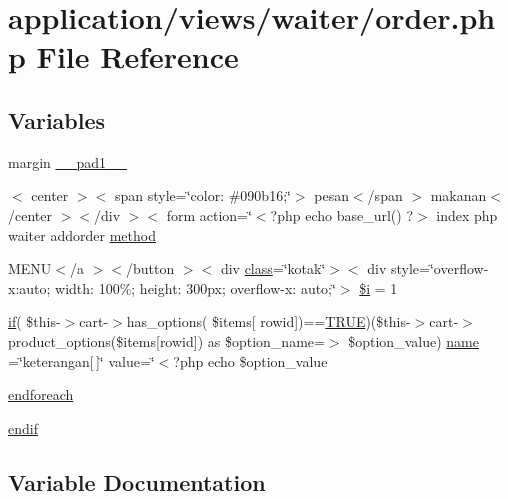 \hypertarget{waiter_2order_8php}{}\section{application/views/waiter/order.php File Reference}
\label{waiter_2order_8php}
\subsection*{Variables}
\begin{DoxyCompactItemize}
\item 
margin \mbox{\hyperlink{waiter_2order_8php_ad8bce65b4dd2f91678e5fe6c17c263b4}{\+\_\+\+\_\+pad1\+\_\+\+\_\+}}
\item 
$<$ center $>$$<$ span style=\char`\"{}color\+: \#090b16;\char`\"{}$>$ pesan$<$/span $>$ makanan$<$/center $>$$<$/div $>$$<$ form action=\char`\"{}$<$?php echo base\+\_\+url() ?$>$ index php waiter addorder \mbox{\hyperlink{waiter_2order_8php_ac0cc2006fd803bf741cbbe406e3f6361}{method}}
\item 
M\+E\+NU$<$/a $>$$<$/button $>$$<$ div \mbox{\hyperlink{waiter_2olaporan_8php_a185c73c6507391d1eb38c776b68ce96d}{class}}=\char`\"{}kotak\char`\"{}$>$$<$ div style=\char`\"{}overflow-\/x\+:auto; width\+: 100\%; height\+: 300px; overflow-\/x\+: auto;\char`\"{}$>$ \mbox{\hyperlink{waiter_2order_8php_a83018d9153d17d91fbcf3bc10158d34f}{\$i}} = 1
\item 
\mbox{\hyperlink{_code_igniter_8php_a68ca62d45495d195f67d234bdafb1d1f}{if}}( \$this-\/$>$cart-\/$>$has\+\_\+options( \$items\mbox{[} \textquotesingle{}rowid\textquotesingle{}\mbox{]})==\mbox{\hyperlink{constants_8php_ae04a3efe6aa42044f803ee90c2277846}{T\+R\+UE}})(\$this-\/$>$cart-\/$>$product\+\_\+options(\$items\mbox{[}\textquotesingle{}rowid\textquotesingle{}\mbox{]}) as \$option\+\_\+name=$>$ \$option\+\_\+value) \mbox{\hyperlink{waiter_2order_8php_afb270cde4944e425a37cf277116a7f43}{name}} =\char`\"{}keterangan\mbox{[}$\,$\mbox{]}\char`\"{} value=\char`\"{}$<$?php echo \$option\+\_\+value
\item 
\mbox{\hyperlink{waiter_2order_8php_a672d9707ef91db026c210f98cc601123}{endforeach}}
\item 
\mbox{\hyperlink{waiter_2order_8php_a82cd33ca97ff99f2fcc5e9c81d65251b}{endif}}
\end{DoxyCompactItemize}


\subsection{Variable Documentation}
\mbox{\label{waiter_2order_8php_a83018d9153d17d91fbcf3bc10158d34f}} 
